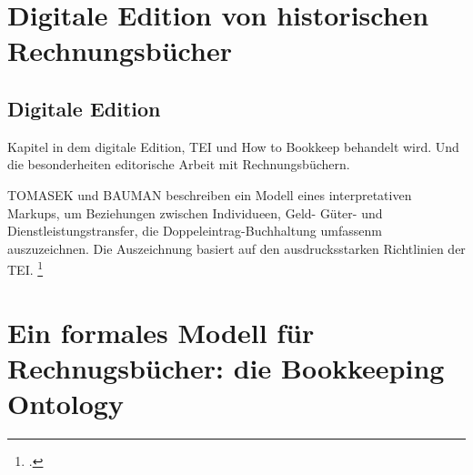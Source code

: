 \documentclass[12pt,a4paper]{article}
\begin{document}
\section{Digitale Edition von historischen Rechnungsbücher}
\label{subsec:DigEdHiRe}

\subsection{Digitale Edition}
Kapitel in dem digitale Edition, TEI und How to Bookkeep behandelt wird. Und die besonderheiten editorische Arbeit mit Rechnungsbüchern. 

TOMASEK und BAUMAN beschreiben ein Modell eines interpretativen Markups, um Beziehungen zwischen Individueen, Geld- Güter- und Dienstleistungstransfer, die Doppeleintrag-Buchhaltung umfassenm auszuzeichnen. Die Auszeichnung basiert auf den ausdrucksstarken Richtlinien der TEI. \footcite[Vgl.][S.1-2, \protect\url{http://journals.openedition.org/jtei/895}, 08.03.2018]{tomasek2013encoding}


\section{Ein formales Modell für Rechnugsbücher: die Bookkeeping Ontology}
\end{document}
